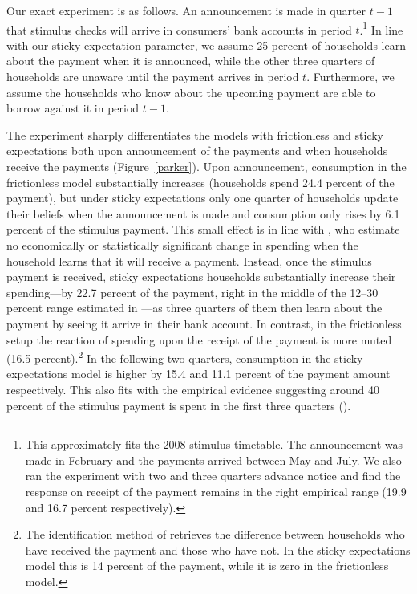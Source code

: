 \documentclass[titlepage]{article}
\begin{document}
Our exact experiment is as follows.  An announcement is made in quarter $t-1$ that stimulus checks will arrive in consumers' bank accounts in period $t$.\footnote{This approximately fits the 2008 stimulus timetable. The announcement was made in February and the payments arrived between May and July. We also ran the experiment with two and three quarters advance notice and find the response on receipt of the payment remains in the right empirical range (19.9 and 16.7 percent respectively).} In line with our sticky expectation parameter, we assume 25 percent of households learn about the payment when it is announced, while the other three quarters of households are unaware until the payment arrives in period $t$. Furthermore, we assume the households who know about the upcoming payment are able to borrow against it in period $t-1$.

The experiment sharply differentiates the models with frictionless and sticky expectations both upon announcement of the payments and when households receive the payments (Figure~\ref{parker}). Upon announcement, consumption in the frictionless model substantially increases (households spend 24.4 percent of the payment), but under sticky expectations only one quarter of households update their beliefs when the announcement is made and consumption only rises by 6.1 percent of the stimulus payment.  This small effect is in line with \cite{brodaParker}, who estimate no economically or statistically significant change in spending when the household learns that it will receive a payment.  Instead, once the stimulus payment is received, sticky expectations households substantially increase their spending---by 22.7 percent of the payment, right in the middle of the 12--30 percent range estimated in \cite{psjmMPC2008}---as three quarters of them then learn about the payment by seeing it arrive in their bank account. In contrast, in the frictionless setup the reaction of spending upon the receipt of the payment is more muted (16.5 percent).\footnote{The identification method of \cite{psjmMPC2008} retrieves the difference between households who have received the payment and those who have not. In the sticky expectations model this is 14 percent of the payment, while it is zero in the frictionless model.} In the following two quarters, consumption in the sticky expectations model is higher by 15.4 and 11.1 percent of the payment amount respectively. This also fits with the empirical evidence suggesting around 40 percent of the stimulus payment is spent in the first three quarters (\cite{psjmMPC2008}).
\end{document}
